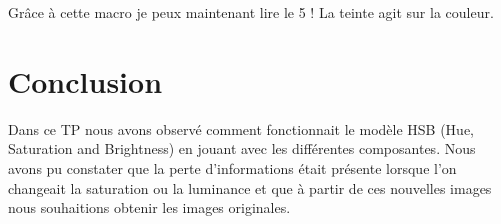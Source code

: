 \documentclass[a4paper,12pt]{report}
\begin{document}
Grâce à cette macro je peux maintenant lire le 5 !
La teinte agit sur la couleur.

\section*{Conclusion}

Dans ce TP nous avons observé comment fonctionnait le modèle HSB (Hue, Saturation and Brightness) en jouant avec les différentes composantes. Nous avons pu constater que la perte d'informations était présente lorsque l'on changeait la saturation ou la luminance et que à partir de ces nouvelles images nous souhaitions obtenir les images originales.
\end{document}
